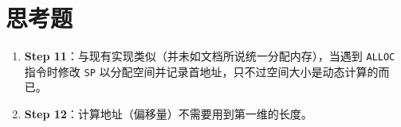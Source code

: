 \documentclass[a4paper]{article}
\begin{document}
\section{思考题}

\begin{enumerate}
    \item \textbf{Step 11}：与现有实现类似（并未如文档所说统一分配内存），当遇到 \texttt{ALLOC} 指令时修改 \texttt{SP} 以分配空间并记录首地址，只不过空间大小是动态计算的而已。
    \item \textbf{Step 12}：计算地址（偏移量）不需要用到第一维的长度。
\end{enumerate}
\end{document}
